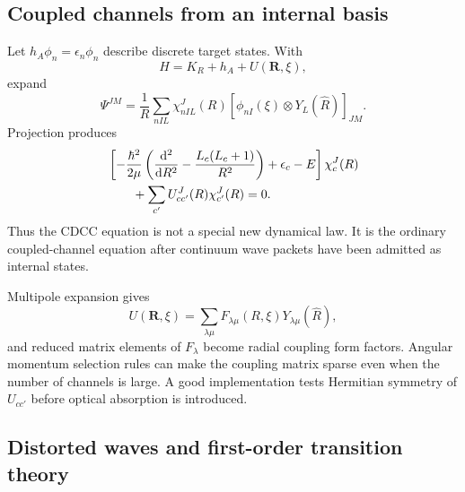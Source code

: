 \subsection{Coupled channels from an internal basis}
\label{subsec:ordinary-coupled-channels}

Let $h_A\phi_n=\epsilon_n\phi_n$ describe discrete target states.  With
\begin{equation}
  H=K_R+h_A+U(\bm R,\xi),
  \label{eq:discrete-cc-H}
\end{equation}
expand
\begin{equation}
  \Psi^{JM}
  =\frac1R\sum_{nIL}\chi_{nIL}^J(R)
  [\phi_{nI}(\xi)\otimes Y_L(\hat R)]_{JM}.
  \label{eq:discrete-cc-expansion}
\end{equation}
Projection produces
\begin{align}
  &\left[-\frac{\hbar^2}{2\mu}
   \left(\frac{\mathrm{d}^2}{\mathrm{d} R^2}-\frac{L_c(L_c+1)}{R^2}\right)
   +\epsilon_c-E\right]\chi_c^J(R)
  \notag\\
  &\qquad+\sum_{c'}U_{cc'}^J(R)\chi_{c'}^J(R)=0.
  \label{eq:ordinary-coupled-equations}
\end{align}
Thus the CDCC equation is not a special new dynamical law.  It is the ordinary
coupled-channel equation after continuum wave packets have been admitted as
internal states.

Multipole expansion gives
\begin{equation}
  U(\bm R,\xi)
  =\sum_{\lambda\mu}F_{\lambda\mu}(R,\xi)
  Y_{\lambda\mu}(\hat R),
  \label{eq:cc-multipole}
\end{equation}
and reduced matrix elements of $F_\lambda$ become radial coupling form
factors.  Angular momentum selection rules can make the coupling matrix
sparse even when the number of channels is large.  A good implementation
tests Hermitian symmetry of $U_{cc'}$ before optical absorption is introduced.

\subsection{Distorted waves and first-order transition theory}
\label{subsec:dwba-foundations}

